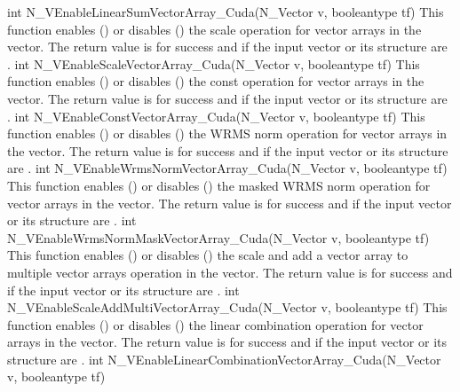 {
  int N\_VEnableLinearSumVectorArray\_Cuda(N\_Vector v, booleantype tf)
}
{
  This function enables () or disables () the scale
  operation for vector arrays in the {\cuda} vector. The return value is  for
  success and  if the input vector or its  structure are .
}
{
  int N\_VEnableScaleVectorArray\_Cuda(N\_Vector v, booleantype tf)
}
{
  This function enables () or disables () the const
  operation for vector arrays in the {\cuda} vector. The return value is  for
  success and  if the input vector or its  structure are .
}
{
  int N\_VEnableConstVectorArray\_Cuda(N\_Vector v, booleantype tf)
}
{
  This function enables () or disables () the WRMS norm
  operation for vector arrays in the {\cuda} vector. The return value is  for
  success and  if the input vector or its  structure are .
}
{
  int N\_VEnableWrmsNormVectorArray\_Cuda(N\_Vector v, booleantype tf)
}
{
  This function enables () or disables () the masked WRMS
  norm operation for vector arrays in the {\cuda} vector. The return value is
   for success and  if the input vector or its  structure are
  .
}
{
  int N\_VEnableWrmsNormMaskVectorArray\_Cuda(N\_Vector v, booleantype tf)
}
{
  This function enables () or disables () the scale and
  add a vector array to multiple vector arrays operation in the {\cuda} vector. The
  return value is  for success and  if the input vector or its
   structure are .
}
{
  int N\_VEnableScaleAddMultiVectorArray\_Cuda(N\_Vector v, booleantype tf)
}
{
  This function enables () or disables () the linear
  combination operation for vector arrays in the {\cuda} vector. The return value
  is  for success and  if the input vector or its  structure
  are .
}
{
  int N\_VEnableLinearCombinationVectorArray\_Cuda(N\_Vector v,
  booleantype tf)
}
